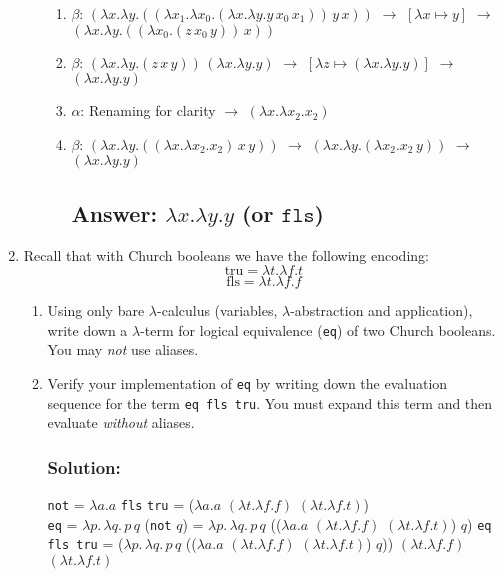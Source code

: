 \documentclass{article}
\begin{document}
\begin{enumerate}
\begin{enumerate}
\begin{enumerate}
        \item $\beta$: 
        $(\lambda x.\lambda y.((\lambda x_1.\lambda x_0.(\lambda x.\lambda y.y \, x_0 \, x_1)) \, y \, x))$
        $\rightarrow$ $[\lambda x \mapsto y]$
        $\rightarrow$ $(\lambda x.\lambda y.((\lambda x_0.(z \, x_0 \, y)) \, x))$
        
        \item $\beta$:
        $(\lambda x.\lambda y.(z \, x \, y)) \, (\lambda x.\lambda y.y)$
        $\rightarrow$ $[\lambda z \mapsto (\lambda x.\lambda y.y)]$
        $\rightarrow$ $(\lambda x.\lambda y.y)$
        
        \item $\alpha$: Renaming for clarity
        $\rightarrow$ $(\lambda x.\lambda x_2.x_2)$
        
        \item $\beta$:
        $(\lambda x.\lambda y.((\lambda x.\lambda x_2.x_2) \, x \, y))$
        $\rightarrow$ $(\lambda x.\lambda y.(\lambda x_2.x_2 \, y))$
        $\rightarrow$ $(\lambda x.\lambda y.y)$
        
        \subsection*{Answer: $\lambda x.\lambda y.y$  (or $\texttt{fls}$)}
    \end{enumerate}

    \end{enumerate}
    
    
    \item Recall that with Church booleans \cite[§5.2]{1} we have the following encoding:
    \[
    \text{tru} = \lambda t.\lambda f.t
    \]
    \[
    \text{fls} = \lambda t.\lambda f.f
    \]
    \begin{enumerate}
        \item Using only bare $\lambda$-calculus (variables, $\lambda$-abstraction and application), write down a $\lambda$-term for logical equivalence (\texttt{eq}) of two Church booleans. You may \emph{not} use aliases.
        \item Verify your implementation of \texttt{eq} by writing down the evaluation sequence for the term \texttt{eq fls tru}. You must expand this term and then evaluate \emph{without} aliases.
        \subsubsection*{Solution:}
        \texttt{not} = $\lambda a. a $ \texttt{fls} \texttt{tru} = ($\lambda a. a $ $(\lambda t.\lambda f.f)$ $(\lambda t.\lambda f.t)$)\\
        \texttt{eq} = $\lambda p.\,\lambda q.\,p\,q$ (\texttt{not} $q$) =  $\lambda p.\,\lambda q.\,p\,q$ (($\lambda a. a $ $(\lambda t.\lambda f.f)$ $(\lambda t.\lambda f.t)$) $q$)
        \texttt{eq fls tru} = ($\lambda p.\,\lambda q.\,p\,q$ (($\lambda a. a $ $(\lambda t.\lambda f.f)$ $(\lambda t.\lambda f.t)$) $q$))
        $(\lambda t.\lambda f.f)$
        $(\lambda t.\lambda f.t)$


\end{enumerate}
\end{enumerate}
\end{document}
